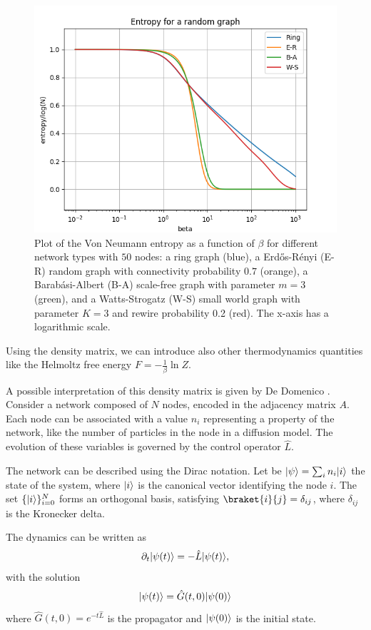 \begin{figure}[ht!]
    \centering
    \includegraphics[width=0.65\linewidth]{image/random_graph.png}
    \caption{Plot of the Von Neumann entropy as a function of $\beta$ for different network types with $50$ nodes: a ring graph (blue), a Erd\H{o}s-Rényi (E-R) random graph with connectivity probability $0.7$ (orange), a Barab\'asi-Albert (B-A) scale-free graph with parameter $m=3$ (green), and a Watts-Strogatz (W-S) small world graph with parameter $K=3$ and rewire probability 0.2 (red). The x-axis has a logarithmic scale. }
    \label{fig:ER-BA-WS}
\end{figure}

Using the density matrix, we can introduce also other thermodynamics quantities like the Helmoltz free energy $F = -\frac{1}{\beta} \ln Z$.


A possible interpretation of this density matrix is given by De Domenico \cite{De_Domenico_2020}.
Consider a network composed of $N$ nodes, encoded in the adjacency matrix $A$. Each node can be associated with a  value $n_i$ representing a property of the network, like the number of particles in the node in a diffusion model. 
The evolution of these variables is governed by the control operator $\hat L$. 

The network can be described using the Dirac notation. Let be $\lvert\psi\rangle = \sum_i n_i \lvert i\rangle$ the state of the system, where $\lvert i\rangle$ is the canonical vector identifying the node $i$. The set $\{\lvert i\rangle\}_{i=0}^N$ forms an orthogonal basis, satisfying $\braket{i}{j} = \delta_{ij}$, where $\delta_{ij}$ is the Kronecker delta.

The dynamics can be written as
\begin{equation} \label{time_evolution}
    \partial_t \lvert\psi(t)\rangle = - \hat L \lvert\psi(t)\rangle,
\end{equation}
with the solution
\begin{equation}
    \lvert\psi(t)\rangle = \hat G(t,0) \lvert\psi(0)\rangle
\end{equation}
where $\hat G(t,0) = e^{-t\hat L}$ is the propagator and $\lvert\psi(0)\rangle$ is the initial state. 

